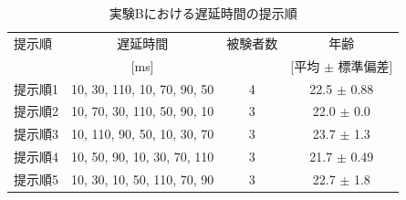 \begin{table}[btp]
  \caption{実験Bにおける遅延時間の提示順}
  \label{table:B_delay_time}
  \centering
  \begin{tabular}{lccc}
    \hline
    提示順 & 遅延時間 & 被験者数 & 年齢\\
    　& [ms] & & [平均 $\pm$ 標準偏差]\\
    \hline \hline
    提示順1  & 10, 30, 110, 10, 70, 90, 50  & 4 & 22.5 $\pm$ 0.88\\
    提示順2  & 10, 70, 30, 110, 50, 90, 10  & 3 & 22.0 $\pm$ 0.0\\
    提示順3  & 10, 110, 90, 50, 10, 30, 70  & 3 & 23.7 $\pm$ 1.3\\
    提示順4  & 10, 50, 90, 10, 30, 70, 110  & 3 & 21.7 $\pm$ 0.49\\
    提示順5  & 10, 30, 10, 50, 110, 70, 90  & 3 & 22.7 $\pm$ 1.8
\\
    \hline
  \end{tabular}
\end{table}
